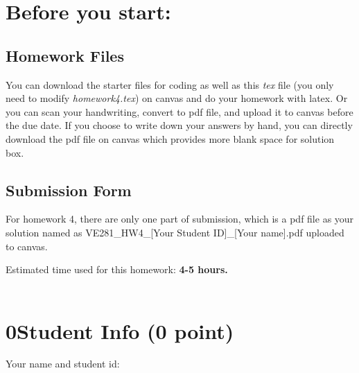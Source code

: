 \documentclass[11pt]{exam}
\newcommand{\hwnum}{4}
\begin{document}
\setlength{\parindent}{0pt}
\section*{Before you start:}

\subsection*{Homework Files}
You can download the starter files for coding as well as this \textit{tex} file (you only need to modify \textit{homework\hwnum.tex}) on canvas and do your homework with latex. Or you can scan your handwriting, convert to pdf file, and upload it to canvas before the due date. If you choose to write down your answers by hand, you can directly download the pdf file on canvas which provides more blank space for solution box.

\subsection*{Submission Form}
For homework \hwnum, there are only one part of submission, which is a pdf file as your solution named as VE281\_HW\hwnum\_[Your Student ID]\_[Your name].pdf uploaded to canvas.

Estimated time used for this homework: \textbf{4-5 hours.}
\\\\


\newpage
\section*{0\quad Student Info (0 point)}
Your name and student id:
\begin{solution}
\end{solution}
\end{document}
